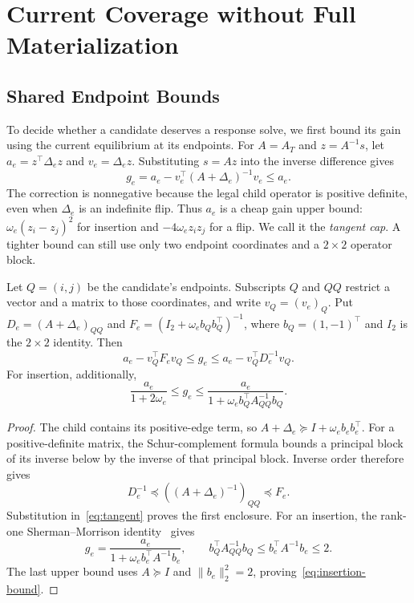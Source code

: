 \section{Current Coverage without Full Materialization}
\label{sec:coverage}

\subsection{Shared Endpoint Bounds}
To decide whether a candidate deserves a response solve, we first bound its gain using the current equilibrium at its endpoints. For $A=A_T$ and $z=A^{-1}s$, let $a_e=z^\top\Delta_e z$ and $v_e=\Delta_e z$. Substituting $s=Az$ into the inverse difference gives
\begin{equation}
 g_e=a_e-v_e^\top(A+\Delta_e)^{-1}v_e\le a_e.
 \label{eq:tangent}
\end{equation}
The correction is nonnegative because the legal child operator is positive definite, even when $\Delta_e$ is an indefinite flip. Thus $a_e$ is a cheap gain upper bound: $\omega_e(z_i-z_j)^2$ for insertion and $-4\omega_ez_iz_j$ for a flip. We call it the \emph{tangent cap}. A tighter bound can still use only two endpoint coordinates and a $2\times2$ operator block.

\begin{theorem}\label{thm:endpoint}
Let $Q=(i,j)$ be the candidate's endpoints. Subscripts $Q$ and $QQ$ restrict a vector and a matrix to those coordinates, and write $v_Q=(v_e)_Q$. Put $D_e=(A+\Delta_e)_{QQ}$ and $F_e=(I_2+\omega_e b_Qb_Q^\top)^{-1}$, where $b_Q=(1,-1)^\top$ and $I_2$ is the $2\times2$ identity. Then
\begin{equation}
 a_e-v_Q^\top F_ev_Q\le g_e\le a_e-v_Q^\top D_e^{-1}v_Q.
 \label{eq:endpoint}
\end{equation}
For insertion, additionally,
\begin{equation}
 \frac{a_e}{1+2\omega_e}\le g_e\le
 \frac{a_e}{1+\omega_e b_Q^\top A_{QQ}^{-1}b_Q}.
 \label{eq:insertion-bound}
\end{equation}
\end{theorem}
\begin{proof}
The child contains its positive-edge term, so $A+\Delta_e\succeq I+\omega_eb_eb_e^\top$. For a positive-definite matrix, the Schur-complement formula bounds a principal block of its inverse below by the inverse of that principal block. Inverse order therefore gives
\[
 D_e^{-1}\preceq((A+\Delta_e)^{-1})_{QQ}\preceq F_e.
\]
Substitution in~\eqref{eq:tangent} proves the first enclosure. For an insertion, the rank-one Sherman--Morrison identity~\cite{Hager1989} gives
\[
 g_e=\frac{a_e}{1+\omega_e b_e^\top A^{-1}b_e},\qquad
 b_Q^\top A_{QQ}^{-1}b_Q\le b_e^\top A^{-1}b_e\le2.
\]
The last upper bound uses $A\succeq I$ and $\|b_e\|_2^2=2$, proving~\eqref{eq:insertion-bound}.
\end{proof}

